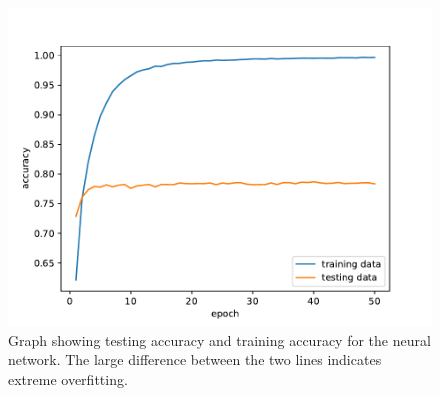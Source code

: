 \documentclass[11pt]{article}
\begin{document}

\begin{figure}
    \centering
    \includegraphics[scale=0.8]{images/epochs.pdf}
    \caption{Graph showing testing accuracy and training accuracy for the neural network. The large difference between the two lines indicates extreme overfitting.}
    \label{fig:epochs}
\end{figure}
\end{document}
